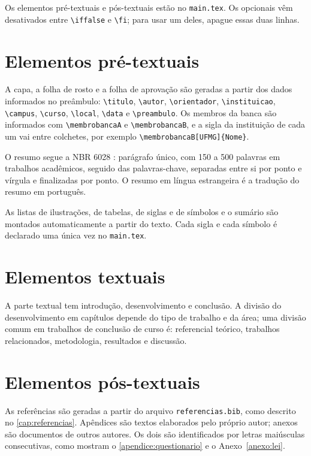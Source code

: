 \documentclass[
	12pt, %
	openright, %
	oneside, %
	a4paper, %
	sumario=tradicional, %
	english, %
	brazil, %
]{abntex2}
\begin{document}
Os elementos pré-textuais e pós-textuais estão no \texttt{main.tex}. Os opcionais vêm desativados entre \verb|\iffalse| e \verb|\fi|; para usar um deles, apague essas duas linhas.

\section{Elementos pré-textuais}\label{sec:pre-textuais}

A capa, a folha de rosto e a folha de aprovação são geradas a partir dos dados informados no preâmbulo: \verb|\titulo|, \verb|\autor|, \verb|\orientador|, \verb|\instituicao|, \verb|\campus|, \verb|\curso|, \verb|\local|, \verb|\data| e \verb|\preambulo|. Os membros da banca são informados com \verb|\membrobancaA| e \verb|\membrobancaB|, e a sigla da instituição de cada um vai entre colchetes, por exemplo \verb|\membrobancaB[UFMG]{Nome}|.

O resumo segue a NBR 6028 \cite{abnt6028}: parágrafo único, com 150 a 500 palavras em trabalhos acadêmicos, seguido das palavras-chave, separadas entre si por ponto e vírgula e finalizadas por ponto. O resumo em língua estrangeira é a tradução do resumo em português.

As listas de ilustrações, de tabelas, de siglas e de símbolos e o sumário \cite{abnt6027} são montados automaticamente a partir do texto. Cada sigla e cada símbolo é declarado uma única vez no \texttt{main.tex}.

\section{Elementos textuais}\label{sec:textuais}

A parte textual tem introdução, desenvolvimento e conclusão. A divisão do desenvolvimento em capítulos depende do tipo de trabalho e da área; uma divisão comum em trabalhos de conclusão de curso é: referencial teórico, trabalhos relacionados, metodologia, resultados e discussão.

\section{Elementos pós-textuais}\label{sec:pos-textuais}

As referências são geradas a partir do arquivo \texttt{referencias.bib}, como descrito no \autoref{cap:referencias}. Apêndices são textos elaborados pelo próprio autor; anexos são documentos de outros autores. Os dois são identificados por letras maiúsculas consecutivas, como mostram o \autoref{apendice:questionario} e o Anexo~\ref{anexo:lei}.
\end{document}
